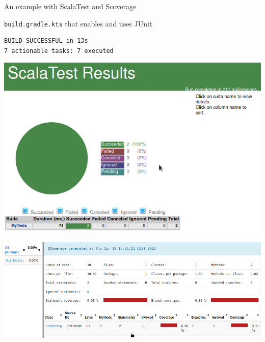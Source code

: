 \documentclass[presentation]{beamer}
\begin{document}
\begin{frame}{An example with ScalaTest and Scoverage}
\begin{block}{\texttt{build.gradle.kts} that enables and uses JUnit}
\begin{verbatim}
BUILD SUCCESSFUL in 13s
7 actionable tasks: 7 executed
		\end{verbatim}
	\end{block}
	\begin{center}
		\includegraphics[width=.90\textwidth]{images/scalatest}
	\end{center}
	\begin{center}
		\includegraphics[width=\textwidth]{images/scoverage}
	\end{center}
\end{frame}
\end{document}
